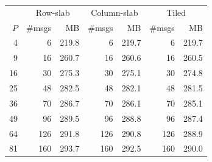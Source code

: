 \begin{tabular}{r|rr|rr|rr}
\hline
 & \multicolumn{2}{c|}{Row-slab} & \multicolumn{2}{c|}{Column-slab} & \multicolumn{2}{c}{Tiled} \\
$P$ & \#msgs & MB & \#msgs & MB & \#msgs & MB \\
\hline
4 & 6 & 219.8 & 6 & 219.7 & 6 & 219.7 \\
9 & 16 & 260.7 & 16 & 260.6 & 16 & 260.5 \\
16 & 30 & 275.3 & 30 & 275.1 & 30 & 274.8 \\
25 & 48 & 282.5 & 48 & 282.1 & 48 & 281.5 \\
36 & 70 & 286.7 & 70 & 286.1 & 70 & 285.1 \\
49 & 96 & 289.5 & 96 & 288.8 & 96 & 287.4 \\
64 & 126 & 291.8 & 126 & 290.8 & 126 & 288.9 \\
81 & 160 & 293.7 & 160 & 292.5 & 160 & 290.0 \\
\hline
\end{tabular}

